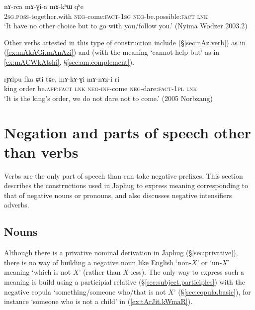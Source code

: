 \begin{exe}
	\ex \label{ex:mAGia.mAkhW}
	\gll  nɤ-rca mɤ-ɣi-a mɤ-kʰɯ qʰe \\
	\textsc{2sg}.\textsc{poss}-together.with \textsc{neg}-come:\textsc{fact}-\textsc{1sg} \textsc{neg}-be.possible:\textsc{fact} \textsc{lnk} \\
	\glt `It have no other choice but to go with you/follow you.' (Nyima Wodzer 2003.2)
\end{exe}

Other verbs attested in this type of construction include  (§\ref{sec:nAz.verb}) as in (\ref{ex:mAkAGi.mAnAzi}) and  (with the meaning `cannot help but' as in \ref{ex:mACWkAtshi}, §\ref{sec:am.complement}).

\begin{exe}
	\ex \label{ex:mAkAGi.mAnAzi}
	\gll rɟɤlpu fka ɕti tɕe, mɤ-kɤ-ɣi mɤ-nɤz-i ri \\
	king order be.\textsc{aff}:\textsc{fact} \textsc{lnk} \textsc{neg}-\textsc{inf}-come \textsc{neg}-dare:\textsc{fact}-\textsc{1pl} \textsc{lnk} \\
	\glt `It is the king's order, we do not dare not to come.' (2005 Norbzang)
\end{exe}


\section{Negation and parts of speech other than verbs} 
Verbs are the only part of speech than can take negative prefixes. This section describes the constructions used in Japhug to express meaning corresponding to that of negative nouns or pronouns, and also discusses negative intensifiers adverbs.

\subsection{Nouns} \label{sec:negation.noun}
Although there is a privative nominal derivation in Japhug (§\ref{sec:privative}), there is no way of building a negative noun like English `non-$X$' or  `un-$X$' meaning `which is not $X$' (rather than $X$-less). The only way to express such a meaning is build using a participial relative (§\ref{sec:subject.participles}) with the negative copula  `something/someone who/that is not $X$' (§\ref{sec:copula.basic}), for instance  `someone who is not a child' in (\ref{ex:tArJit.kWmaR}).

